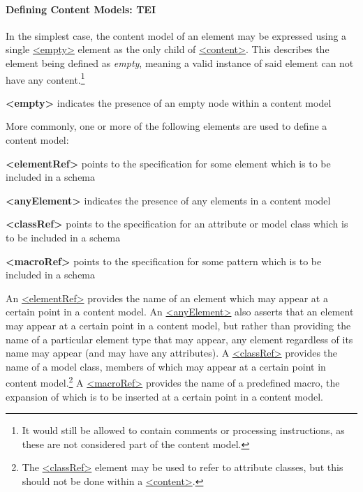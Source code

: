 \paragraph[{Defining Content Models: TEI}]{Defining Content Models: TEI}\label{DEFCONTEI}\par
In the simplest case, the content model of an element may be expressed using a single \hyperref[TEI.empty]{<empty>} element as the only child of \hyperref[TEI.content]{<content>}. This describes the element being defined as \textit{empty}, meaning a valid instance of said element can not have any content.\footnote{It would still be allowed to contain comments or processing instructions, as these are not considered part of the content model.} 
\begin{sansreflist}
  
\item [\textbf{<empty>}] indicates the presence of an empty node within a content model
\end{sansreflist}
\par
More commonly, one or more of the following elements are used to define a content model: 
\begin{sansreflist}
  
\item [\textbf{<elementRef>}] points to the specification for some element which is to be included in a schema
\item [\textbf{<anyElement>}] indicates the presence of any elements in a content model
\item [\textbf{<classRef>}] points to the specification for an attribute or model class which is to be included in a schema
\item [\textbf{<macroRef>}] points to the specification for some pattern which is to be included in a schema
\end{sansreflist}
\par
An \hyperref[TEI.elementRef]{<elementRef>} provides the name of an element which may appear at a certain point in a content model. An \hyperref[TEI.anyElement]{<anyElement>} also asserts that an element may appear at a certain point in a content model, but rather than providing the name of a particular element type that may appear, any element regardless of its name may appear (and may have any attributes). A \hyperref[TEI.classRef]{<classRef>} provides the name of a model class, members of which may appear at a certain point in content model.\footnote{The \hyperref[TEI.classRef]{<classRef>} element may be used to refer to attribute classes, but this should not be done within a \hyperref[TEI.content]{<content>}.} A \hyperref[TEI.macroRef]{<macroRef>} provides the name of a predefined macro, the expansion of which is to be inserted at a certain point in a content model.\par
